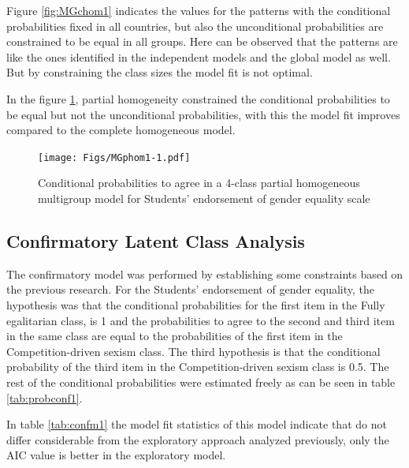 \documentclass[12pt,a4paper,oneside]{reedthesis}
\begin{document}
Figure \ref{fig:MGchom1} indicates the values for the patterns with the conditional probabilities fixed in all countries, but also the unconditional probabilities are constrained to be equal in all groups. Here can be observed that the patterns are like the ones identified in the independent models and the global model as well. But by constraining the class sizes the model fit is not optimal.

In the figure \ref{fig:MGphom1}, partial homogeneity constrained the conditional probabilities to be equal but not the unconditional probabilities, with this the model fit improves compared to the complete homogeneous model.
\begin{figure}
\centering
\texttt{[image: Figs/MGphom1-1.pdf]}
\caption{\label{fig:MGphom1}Conditional probabilities to agree in a 4-class partial homogeneous multigroup model for Students' endorsement of gender equality scale}
\end{figure}
\hypertarget{confirmatory-latent-class-analysis}{%
\subsection{Confirmatory Latent Class Analysis}\label{confirmatory-latent-class-analysis}}

The confirmatory model was performed by establishing some constraints based on the previous research. For the Students' endorsement of gender equality, the hypothesis was that the conditional probabilities for the first item in the Fully egalitarian class, is 1 and the probabilities to agree to the second and third item in the same class are equal to the probabilities of the first item in the Competition-driven sexism class. The third hypothesis is that the conditional probability of the third item in the Competition-driven sexism class is 0.5. The rest of the conditional probabilities were estimated freely as can be seen in table \ref{tab:probconf1}.

In table \ref{tab:confm1} the model fit statistics of this model indicate that do not differ considerable from the exploratory approach analyzed previously, only the AIC value is better in the exploratory model.
\end{document}
